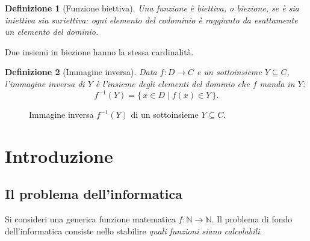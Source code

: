\documentclass[a4paper, 11pt, oneside]{book}
\theoremstyle{formale}
\newtheorem*{definition}{Definizione}
\begin{document}
    \begin{definition}[Funzione biettiva]
        Una funzione \`e \emph{biettiva}, o \emph{biezione}, se \`e sia iniettiva sia
        suriettiva: ogni elemento del codominio \`e raggiunto da \emph{esattamente un}
        elemento del dominio.
    \end{definition}
    Due insiemi in biezione hanno la stessa cardinalit\`a.

    \begin{definition}[Immagine inversa]
        Data $f \colon D \to C$ e un sottoinsieme $Y \subseteq C$, l'\emph{immagine
        inversa} di $Y$ \`e l'insieme degli elementi del dominio che $f$ manda in $Y$:
        \begin{equation*}
            f^{-1}(Y) = \{\, x \in D \mid f(x) \in Y \,\}.
        \end{equation*}
    \end{definition}

    \begin{figure}[H]
        \centering
        \caption{Immagine inversa $f^{-1}(Y)$ di un sottoinsieme $Y \subseteq C$.}
        \label{fig:inversa}
    \end{figure}

    \chapter{Introduzione}
    \section{Il problema dell'informatica}
    Si consideri una generica funzione matematica $f \colon \mathbb{N} \to \mathbb{N}$. Il
    problema di fondo dell'informatica consiste nello stabilire \emph{quali funzioni siano
    calcolabili}.
\end{document}

